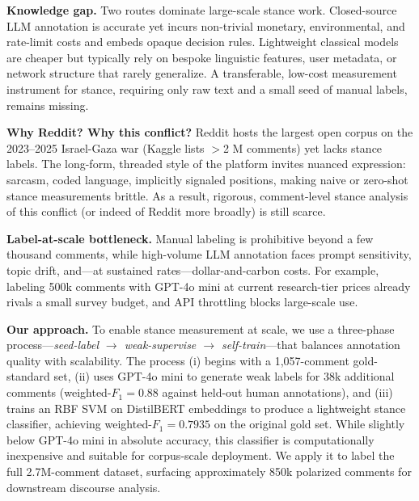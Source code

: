 \documentclass[letterpaper]{article} %
\begin{document}
\textbf{Knowledge gap.} Two routes dominate large-scale stance work. Closed-source LLM annotation is accurate yet incurs non-trivial monetary, environmental, and rate-limit costs and embeds opaque decision rules.  Lightweight classical models are cheaper but typically rely on bespoke linguistic features, user metadata, or network structure that rarely generalize. A transferable, low-cost measurement instrument for stance, requiring only raw text and a small seed of manual labels, remains missing.

\textbf{Why Reddit? Why this conflict?} Reddit hosts the largest open corpus on the 2023--2025 Israel-Gaza war (Kaggle lists $>$2 M comments) yet lacks stance labels.  The long-form, threaded style of the platform invites nuanced expression: sarcasm, coded language, implicitly signaled positions, making naive or zero-shot stance measurements brittle. As a result, rigorous, comment-level stance analysis of this conflict (or indeed of Reddit more broadly) is still scarce.

\textbf{Label-at-scale bottleneck.} Manual labeling is prohibitive beyond a few thousand comments, while high-volume LLM annotation faces prompt sensitivity, topic drift, and---at sustained rates---dollar-and-carbon costs.  For example, labeling 500k comments with GPT-4o mini at current research-tier prices already rivals a small survey budget, and API throttling blocks large-scale use.

\textbf{Our approach.} To enable stance measurement at scale, we use a three-phase process---\emph{seed-label $\rightarrow$ weak-supervise $\rightarrow$ self-train}---that balances annotation quality with scalability. The process (i) begins with a 1{,}057-comment gold-standard set, (ii) uses GPT-4o mini to generate weak labels for 38k additional comments (weighted-$F_{1}=0.88$ against held-out human annotations), and (iii) trains an RBF SVM on DistilBERT embeddings to produce a lightweight stance classifier, achieving weighted-$F_{1}=0.7935$ on the original gold set. While slightly below GPT-4o mini in absolute accuracy, this classifier is computationally inexpensive and suitable for corpus-scale deployment. We apply it to label the full 2.7M-comment dataset, surfacing approximately 850k polarized comments for downstream discourse analysis.
\end{document}

